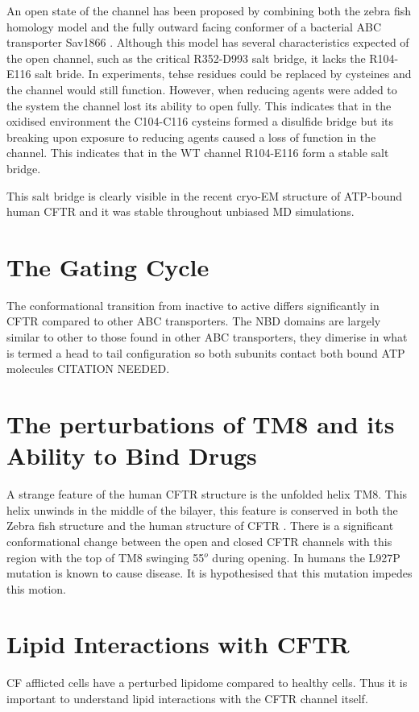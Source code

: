 An open state of the channel has been proposed by combining both the zebra fish homology model and the fully outward facing conformer of a bacterial ABC transporter Sav1866 \cite{Hoffman2018}. Although this model has several characteristics expected of the open channel, such as the critical R352-D993 salt bridge, it lacks the R104-E116 salt bride. In experiments, tehse residues could be replaced by cysteines and the channel would still function. However, when reducing agents were added to the system the channel lost its ability to open fully. This indicates that in the oxidised environment the C104-C116 cysteins formed a disulfide bridge but its breaking upon exposure to reducing agents caused a loss of function in the channel. This indicates that in the WT channel R104-E116 form a stable salt bridge. 

This salt bridge is clearly visible in the recent cryo-EM structure of ATP-bound human CFTR \cite{Zhang2018} and it was stable throughout unbiased MD simulations.

\section{The Gating Cycle}
The conformational transition from inactive to active differs significantly in CFTR compared to other ABC transporters. The NBD domains are largely similar to other to those found in other ABC transporters, they dimerise in what is termed a head to tail configuration so both subunits contact both bound ATP molecules CITATION NEEDED. 

\section{The perturbations of TM8 and its Ability to Bind Drugs}
A strange feature of the human CFTR structure is the unfolded helix TM8. This helix unwinds in the middle of the bilayer, this feature is conserved in both the Zebra fish structure and the human structure of CFTR \cite{Zhang2017}\cite{Zhang2018}. There is a significant conformational change between the open and closed CFTR channels with this region with the top of TM8 swinging 55$^o$ during opening. In humans the L927P mutation is known to cause disease. It is hypothesised that this mutation impedes this motion.



\section{Lipid Interactions with CFTR}
CF afflicted cells have a perturbed lipidome compared to healthy cells.\cite{Cottrill2020} Thus it is important to understand lipid interactions with the CFTR channel itself.
